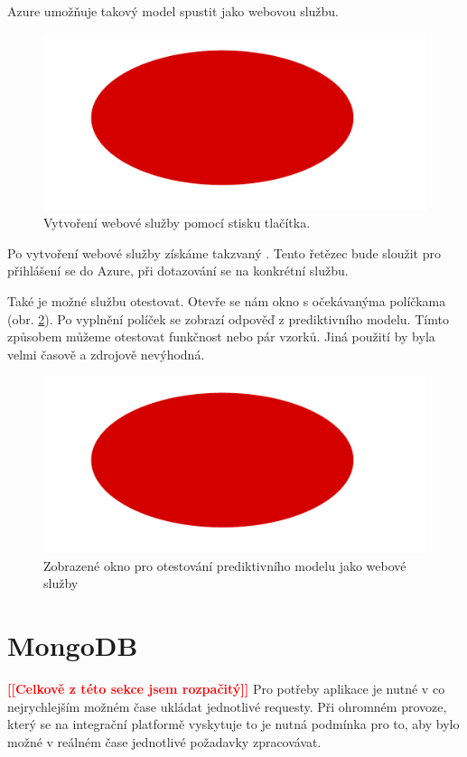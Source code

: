 \documentclass[thesis=M,czech]{FITthesis}[2012/10/20]
\newcommand{\todo}[1]{\textcolor{red}{\textbf{[[#1]]}}}
\begin{document}
			Azure umožňuje takový model spustit jako webovou službu.
			
			  \begin{figure}[htb]\centering
			  	\includegraphics[width=\textwidth]{./img/todo}
			  	\caption{Vytvoření webové služby pomocí stisku tlačítka.}
			  	\label{fig:azure_create_web_servise}
			  \end{figure}
		  
		  Po vytvoření webové služby získáme takzvaný . Tento řetězec bude sloužit pro přihlášení se do Azure, při dotazování se na konkrétní službu.
		  
		  Také je možné službu otestovat. Otevře se nám okno s očekávanýma políčkama (obr. \ref{fig:azure_test_web_service}). Po vyplnění políček se zobrazí odpověď z prediktivního modelu. Tímto způsobem můžeme otestovat funkčnost nebo pár vzorků. Jiná použití by byla velmi časově a zdrojově nevýhodná.
		  
		  \begin{figure}[htb]\centering
		  	\includegraphics[width=\textwidth]{./img/todo}
		  	\caption{Zobrazené okno pro otestování prediktivního modelu jako webové služby}
		  	\label{fig:azure_test_web_service}
		  \end{figure}
	
	\section{MongoDB}
	\todo{Celkově z této sekce jsem rozpačitý}
		Pro potřeby aplikace je nutné v co nejrychlejším možném čase ukládat jednotlivé requesty. Při ohromném provoze, který se na integrační platformě vyskytuje to je nutná podmínka pro to, aby bylo možné v reálném čase jednotlivé požadavky zpracovávat.
		
\end{document}
